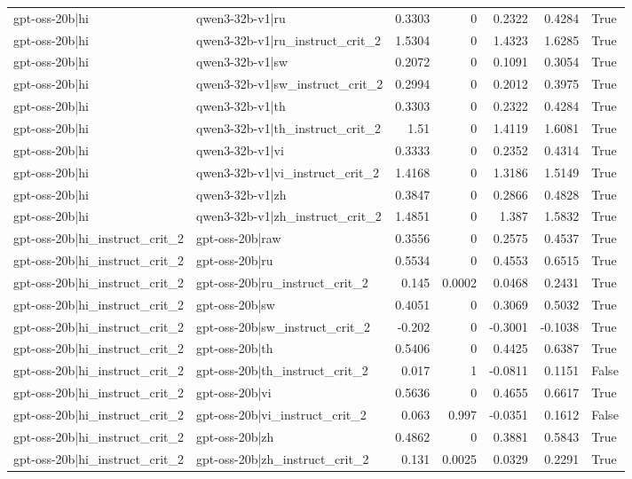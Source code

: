 \begin{table}
\begin{tabular}{l l r r r r l}
gpt-oss-20b|hi & qwen3-32b-v1|ru & 0.3303 & 0 & 0.2322 & 0.4284 & True \\
gpt-oss-20b|hi & qwen3-32b-v1|ru_instruct_crit_2 & 1.5304 & 0 & 1.4323 & 1.6285 & True \\
gpt-oss-20b|hi & qwen3-32b-v1|sw & 0.2072 & 0 & 0.1091 & 0.3054 & True \\
gpt-oss-20b|hi & qwen3-32b-v1|sw_instruct_crit_2 & 0.2994 & 0 & 0.2012 & 0.3975 & True \\
gpt-oss-20b|hi & qwen3-32b-v1|th & 0.3303 & 0 & 0.2322 & 0.4284 & True \\
gpt-oss-20b|hi & qwen3-32b-v1|th_instruct_crit_2 & 1.51 & 0 & 1.4119 & 1.6081 & True \\
gpt-oss-20b|hi & qwen3-32b-v1|vi & 0.3333 & 0 & 0.2352 & 0.4314 & True \\
gpt-oss-20b|hi & qwen3-32b-v1|vi_instruct_crit_2 & 1.4168 & 0 & 1.3186 & 1.5149 & True \\
gpt-oss-20b|hi & qwen3-32b-v1|zh & 0.3847 & 0 & 0.2866 & 0.4828 & True \\
gpt-oss-20b|hi & qwen3-32b-v1|zh_instruct_crit_2 & 1.4851 & 0 & 1.387 & 1.5832 & True \\
gpt-oss-20b|hi_instruct_crit_2 & gpt-oss-20b|raw & 0.3556 & 0 & 0.2575 & 0.4537 & True \\
gpt-oss-20b|hi_instruct_crit_2 & gpt-oss-20b|ru & 0.5534 & 0 & 0.4553 & 0.6515 & True \\
gpt-oss-20b|hi_instruct_crit_2 & gpt-oss-20b|ru_instruct_crit_2 & 0.145 & 0.0002 & 0.0468 & 0.2431 & True \\
gpt-oss-20b|hi_instruct_crit_2 & gpt-oss-20b|sw & 0.4051 & 0 & 0.3069 & 0.5032 & True \\
gpt-oss-20b|hi_instruct_crit_2 & gpt-oss-20b|sw_instruct_crit_2 & -0.202 & 0 & -0.3001 & -0.1038 & True \\
gpt-oss-20b|hi_instruct_crit_2 & gpt-oss-20b|th & 0.5406 & 0 & 0.4425 & 0.6387 & True \\
gpt-oss-20b|hi_instruct_crit_2 & gpt-oss-20b|th_instruct_crit_2 & 0.017 & 1 & -0.0811 & 0.1151 & False \\
gpt-oss-20b|hi_instruct_crit_2 & gpt-oss-20b|vi & 0.5636 & 0 & 0.4655 & 0.6617 & True \\
gpt-oss-20b|hi_instruct_crit_2 & gpt-oss-20b|vi_instruct_crit_2 & 0.063 & 0.997 & -0.0351 & 0.1612 & False \\
gpt-oss-20b|hi_instruct_crit_2 & gpt-oss-20b|zh & 0.4862 & 0 & 0.3881 & 0.5843 & True \\
gpt-oss-20b|hi_instruct_crit_2 & gpt-oss-20b|zh_instruct_crit_2 & 0.131 & 0.0025 & 0.0329 & 0.2291 & True \\

\end{tabular}
\end{table}
